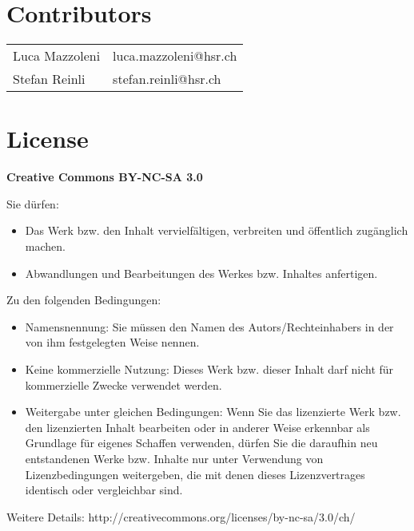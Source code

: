 \section*{Contributors}
\begin{tabular}{ll}
    Luca Mazzoleni& luca.mazzoleni@hsr.ch \\ 
    Stefan Reinli & stefan.reinli@hsr.ch \\ 
\end{tabular} 

{\scriptsize 
    \section*{License}
    \textbf{Creative Commons BY-NC-SA 3.0}
    
    Sie dürfen:
    \begin{itemize}
        \item Das Werk bzw. den Inhalt vervielfältigen, verbreiten und öffentlich
        zugänglich machen.
        \item Abwandlungen und Bearbeitungen des Werkes bzw. Inhaltes anfertigen.
    \end{itemize}
    Zu den folgenden Bedingungen:
    \begin{itemize}
        \item Namensnennung: Sie müssen den Namen des Autors/Rechteinhabers in der von ihm
        festgelegten Weise nennen.
        \item Keine kommerzielle Nutzung: Dieses Werk bzw. dieser Inhalt darf nicht für
        kommerzielle Zwecke verwendet werden.
        \item  Weitergabe unter gleichen Bedingungen: Wenn Sie das lizenzierte Werk bzw. den
        lizenzierten Inhalt bearbeiten oder in anderer Weise erkennbar als Grundlage
        für eigenes Schaffen verwenden, dürfen Sie die daraufhin neu entstandenen
        Werke bzw. Inhalte nur unter Verwendung von Lizenzbedingungen weitergeben,
        die mit denen dieses Lizenzvertrages identisch oder vergleichbar sind.
    \end{itemize}
    Weitere Details: http://creativecommons.org/licenses/by-nc-sa/3.0/ch/
}
\clearpage
{}%